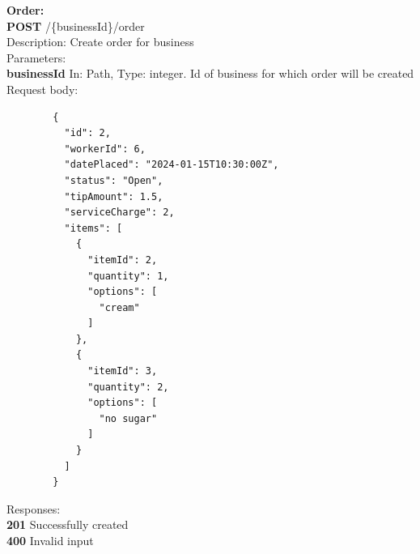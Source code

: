 \documentclass[11pt,a4paper,pdftex]{article}
\begin{document}
\textbf{Order:}\\
\hspace*{1em}\textbf{POST} /\{businessId\}/order\\
\hspace*{2em}Description: Create order for business\\
\hspace*{2em}Parameters:\\
\hspace*{3em}\textbf{businessId} In: Path, Type: integer. Id of business for which order will be created\\
\hspace*{2em}Request body:
\begin{verbatim}
        {
          "id": 2,
          "workerId": 6,
          "datePlaced": "2024-01-15T10:30:00Z",
          "status": "Open",
          "tipAmount": 1.5,
          "serviceCharge": 2,
          "items": [
            {
              "itemId": 2,
              "quantity": 1,
              "options": [
                "cream"
              ]
            },
            {
              "itemId": 3,
              "quantity": 2,
              "options": [
                "no sugar"
              ]
            }
          ]
        }
\end{verbatim}
\hspace*{2em}Responses:\\
\hspace*{3em}\textbf{201} Successfully created\\
\hspace*{3em}\textbf{400} Invalid input
\end{document}

